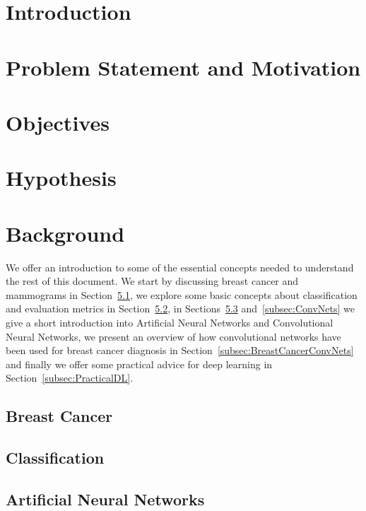 \documentclass[11pt]{article}
\begin{document}
\section{Introduction}


\section{Problem Statement and Motivation}
\label{sec:ProblemDefinition}


\section{Objectives}
\label{sec:Objectives}


\section{Hypothesis}
\label{sec:Hypothesis}


\section{Background}
\label{sec:Background}
We offer an introduction to some of the essential concepts needed to understand the rest of this document. We start by discussing breast cancer and mammograms in Section~\ref{subsec:BreastCancer}, we explore some basic concepts about classification and evaluation metrics in Section~\ref{subsec:Classification}, in Sections~\ref{subsec:ANNs} and~\ref{subsec:ConvNets} we give a short introduction into Artificial Neural Networks and Convolutional Neural Networks, we present an overview of how convolutional networks have been used for breast cancer diagnosis in Section~\ref{subsec:BreastCancerConvNets} and finally we offer some practical advice for deep learning in Section~\ref{subsec:PracticalDL}.

	\subsection{Breast Cancer}
	\label{subsec:BreastCancer}
	

	\subsection{Classification}
	\label{subsec:Classification}
	

	\subsection{Artificial Neural Networks}
	\label{subsec:ANNs}
	
\end{document}
